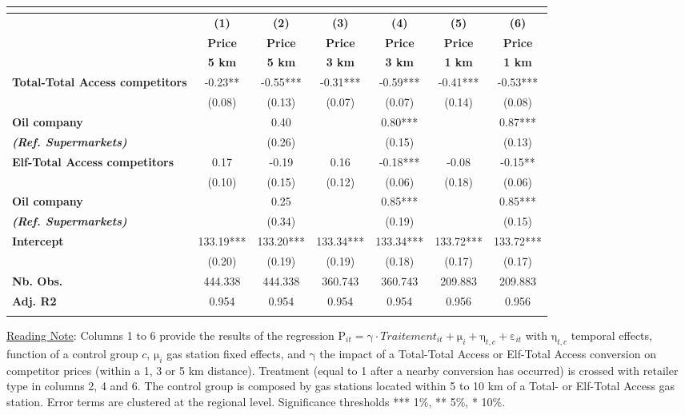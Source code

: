 \documentclass[english]{article}
\begin{document}
\begin{center}
\begin{footnotesize} %
\begin{tabular}{l|cccccc}
\multicolumn{1}{l}{} &  &  &  &  &  & \tabularnewline
\hline
\hline
 & \textbf{(1)}  & \textbf{(2)}  & \textbf{(3)}  & \textbf{(4)}  & \textbf{(5)}  & \textbf{(6)}\tabularnewline
 & \textbf{Price}  & \textbf{Price}  & \textbf{Price}  & \textbf{Price}  & \textbf{Price}  & \textbf{Price}\tabularnewline
 & \textbf{5 km}  & \textbf{5 km}  & \textbf{3 km}  & \textbf{3 km}  & \textbf{1 km}  & \textbf{1 km}\tabularnewline
\hline
\textbf{Total-Total Access competitors}  & -0.23{*}{*}  & -0.55{*}{*}{*}  & -0.31{*}{*}{*}  & -0.59{*}{*}{*}  & -0.41{*}{*}{*}  & -0.53{*}{*}{*}\tabularnewline
 & (0.08)  & (0.13)  & (0.07)  & (0.07)  & (0.14)  & (0.08)\tabularnewline
\textbf{Oil company}  &  & 0.40  &  & 0.80{*}{*}{*}  &  & 0.87{*}{*}{*}\tabularnewline
\textbf{\textit{(Ref. Supermarkets)}}  &  & (0.26)  &  & (0.15)  &  & (0.13)\tabularnewline
\hline
\textbf{Elf-Total Access competitors}  & 0.17  & -0.19  & 0.16  & -0.18{*}{*}{*}  & -0.08  & -0.15{*}{*}\tabularnewline
 & (0.10)  & (0.15)  & (0.12)  & (0.06)  & (0.18)  & (0.06)\tabularnewline
\textbf{Oil company}  &  & 0.25  &  & 0.85{*}{*}{*}  &  & 0.85{*}{*}{*}\tabularnewline
\textbf{\textit{(Ref. Supermarkets)}}  &  & (0.34)  &  & (0.19)  &  & (0.15)\tabularnewline
\hline
\textbf{Intercept}  & 133.19{*}{*}{*}  & 133.20{*}{*}{*}  & 133.34{*}{*}{*}  & 133.34{*}{*}{*}  & 133.72{*}{*}{*}  & 133.72{*}{*}{*}\tabularnewline
 & (0.20)  & (0.19)  & (0.19)  & (0.18)  & (0.17)  & (0.17)\tabularnewline
\hline
\textbf{Nb. Obs.}  & 444.338  & 444.338  & 360.743  & 360.743  & 209.883  & 209.883\tabularnewline
\textbf{Adj. R2}  & 0.954  & 0.954  & 0.954  & 0.954  & 0.956  & 0.956\tabularnewline
\hline
\hline
\multicolumn{1}{l}{} &  &  &  &  &  & \tabularnewline
\end{tabular}\end{footnotesize}
\par\end{center}

{\small{}\uline{Reading Note}}{\small{}: } Columns 1 to 6 provide the results of the regression $\mathrm{P}_{it}=\mathrm{\gamma}\cdot Traitement_{it}+\mathrm{\mu}_{i}+\mathrm{\eta}_{t,c}+\mathrm{\varepsilon}_{it}$
with $\mathrm{\eta}_{t,c}$ temporal effects, function of a control group $c$, $\mathrm{\mu}_{i}$ gas station fixed effects, and $\mathrm{\gamma}$ the impact of a Total-Total Access or Elf-Total Access conversion on competitor prices (within a 1, 3 or 5 km distance). Treatment (equal to 1 after a nearby conversion has occurred) is crossed with retailer type in columns 2, 4 and 6. The control group is composed by gas stations located within 5 to 10 km of a Total- or Elf-Total Access gas station. Error terms are clustered at the regional level. Significance thresholds {*}{*}{*} 1\%, {*}{*} 5\%, {*} 10\%.\medskip{}
\end{document}
